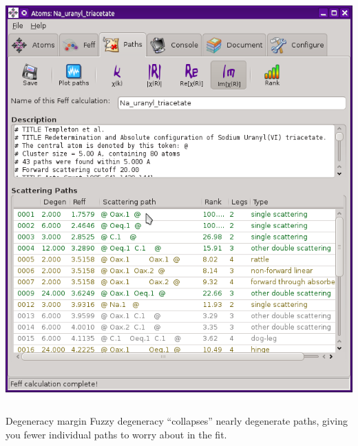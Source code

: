 \documentclass[10pt, xcolor=x11names, compress]{beamer}
\begin{document}
\begin{frame}
\begin{columns}[T]
\begin{column}{0.5\linewidth}
\begin{center}
        \includegraphics[width=0.85\linewidth]{images/paths.png}
      \end{center}
    \end{column}
  \end{columns}
  \begin{block}{Degeneracy margin}
    Fuzzy degeneracy ``collapses'' nearly degenerate paths, giving you
    fewer individual paths to worry about in the fit.
  \end{block}
\end{frame}
\end{document}
